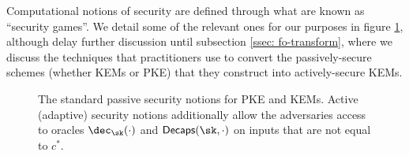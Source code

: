 Computational notions of security are defined through what are known as ``security games''.
We detail some of the relevant ones for our purposes in figure \ref{fig: sec-games}, although delay further discussion until subsection \ref{ssec: fo-transform}, where we discuss the techniques that practitioners use to convert the passively-secure schemes (whether KEMs or PKE) that they construct into actively-secure KEMs.

\begin{figure}[h]\label{fig: sec-games}
	\begin{center}
		\begin{minipage}{.45\linewidth}
		\end{minipage}\hfill \begin{minipage}{.45\linewidth}
	\end{minipage}
	\end{center}
\caption{The standard passive security notions for PKE and KEMs.
Active (adaptive) security notions additionally allow the adversaries access to oracles $\dec_{\sk}(\cdot)$ and $\decaps(\sk, \cdot)$ on inputs that are not equal to $c^*$.}
\end{figure}

